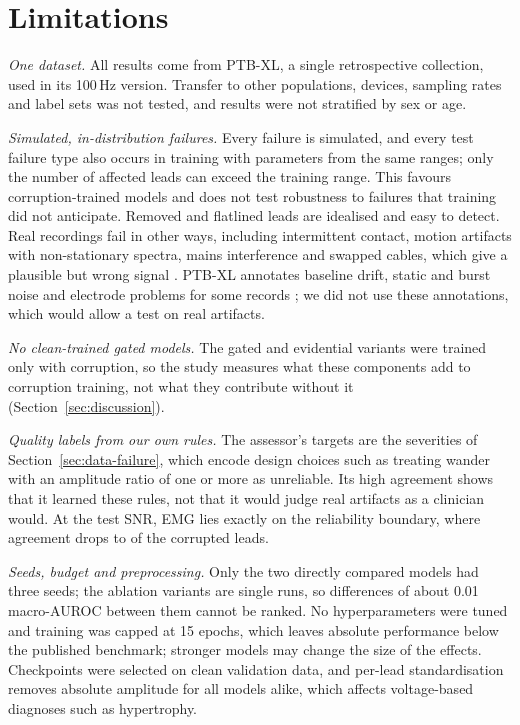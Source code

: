 \section{Limitations}
\label{sec:limitations}

\emph{One dataset.} All results come from PTB-XL, a single retrospective collection, used in its 100\,Hz version.
Transfer to other populations, devices, sampling rates and label sets was not tested, and results were not stratified
by sex or age.

\emph{Simulated, in-distribution failures.} Every failure is simulated, and every test failure type also occurs in
training with parameters from the same ranges; only the number of affected leads can exceed the training range. This
favours corruption-trained models and does not test robustness to failures that training did not anticipate. Removed
and flatlined leads are idealised and easy to detect. Real recordings fail in other ways, including intermittent
contact, motion artifacts with non-stationary spectra, mains interference and swapped cables, which give a
plausible but wrong signal \cite{batchvarov2007incorrect}. PTB-XL annotates baseline drift, static and burst noise
and electrode problems for some records \cite{ptbxl103}; we did not use these annotations, which would allow a test on
real artifacts.

\emph{No clean-trained gated models.} The gated and evidential variants were trained only with corruption, so the
study measures what these components add to corruption training, not what they contribute without it
(Section~\ref{sec:discussion}).

\emph{Quality labels from our own rules.} The assessor's targets are the severities of
Section~\ref{sec:data-failure}, which encode design choices such as treating wander with an amplitude ratio of one
or more as unreliable. Its high agreement shows that it learned these rules, not that it would judge real artifacts
as a clinician would. At the test SNR, EMG lies exactly on the reliability boundary, where agreement drops to
\sqaEmgTestCorrupted{} of the corrupted leads.

\emph{Seeds, budget and preprocessing.} Only the two directly compared models had three seeds; the ablation variants
are single runs, so differences of about 0.01 macro-AUROC between them cannot be ranked. No hyperparameters were tuned
and training was capped at 15 epochs, which leaves absolute performance below the published benchmark; stronger
models may change the size of the effects. Checkpoints were selected on clean validation data, and per-lead
standardisation removes absolute amplitude for all models alike, which affects voltage-based diagnoses such as
hypertrophy.


